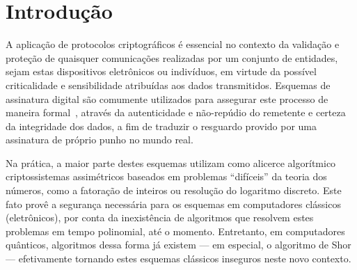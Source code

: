 \documentclass{ufsctex/ufsctex}
\begin{document}

\capa{}
\folhaderosto{}
\folhaaprovacao{}
\paginadedicatoria{}
\paginaagradecimento{}
\paginaepigrafe{}
\paginaresumo{}
\paginaabstract{}

\listadefiguras{}
\listadetabelas{}
\listadeabreviaturas{}
\listadesimbolos{}
\listofalgorithms{}

\sumario{}

\chapter{Introdução}\label{chapter:intro}

A aplicação de protocolos criptográficos é essencial no contexto da validação e
proteção de quaisquer comunicações realizadas por um conjunto de entidades,
sejam estas dispositivos eletrônicos ou indivíduos, em virtude da possível
criticalidade e sensibilidade atribuídas aos dados transmitidos. Esquemas de
assinatura digital são comumente utilizados para assegurar este processo de
maneira formal~\cite{Goldreich:2004:FCV:975541}, através da autenticidade e
não-repúdio do remetente e certeza da integridade dos dados, a fim de traduzir
o resguardo provido por uma assinatura de próprio punho no mundo real.

Na prática, a maior parte destes esquemas utilizam como alicerce algorítmico
criptossistemas assimétricos baseados em problemas ``difíceis'' da teoria dos
números, como a fatoração de inteiros ou resolução do logaritmo discreto.  Este
fato provê a segurança necessária para os esquemas em computadores clássicos
(eletrônicos), por conta da inexistência de algoritmos que resolvem estes
problemas em tempo polinomial, até o momento.  Entretanto, em computadores
quânticos, algoritmos dessa forma já existem --- em especial, o algoritmo de
Shor~\cite{Shor:1997:PAP:264393.264406} --- efetivamente tornando estes esquemas
clássicos inseguros neste novo contexto.
\end{document}
